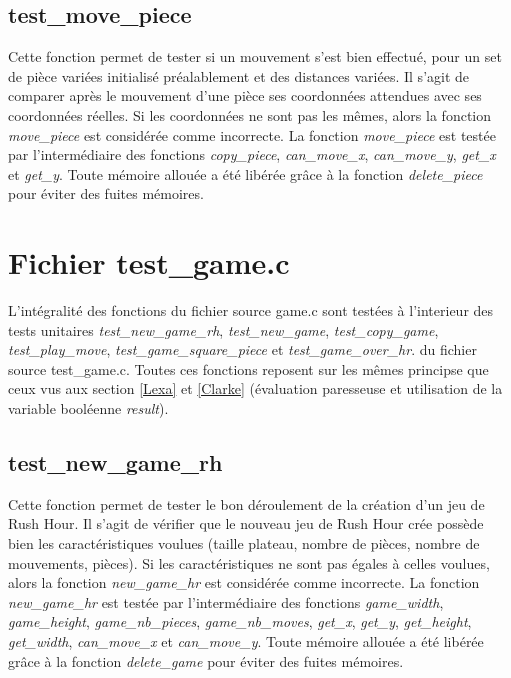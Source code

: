 \documentclass{report}
\begin{document}
\subsection{test\_move\_piece}
Cette fonction permet de tester si un mouvement s'est bien effectué, pour un set de pièce variées initialisé préalablement et des distances variées. Il s'agit de comparer après le mouvement d'une pièce ses coordonnées attendues avec ses coordonnées réelles. Si les coordonnées ne sont pas les mêmes, alors la fonction \emph{move\_piece} est considérée comme incorrecte. La fonction \emph{move\_piece} est testée par l'intermédiaire des fonctions \emph{copy\_piece}, \emph{can\_move\_x}, \emph{can\_move\_y}, \emph{get\_x} et \emph{get\_y}. Toute mémoire allouée a été libérée grâce à la fonction \emph{delete\_piece} pour éviter des fuites mémoires.

\section{Fichier test\_game.c}
L'intégralité des fonctions du fichier source game.c sont testées à l'interieur des tests unitaires \emph{test\_new\_game\_rh}, \emph{test\_new\_game}, \emph{test\_copy\_game}, \emph{test\_play\_move}, \emph{test\_game\_square\_piece} et \emph{test\_game\_over\_hr}. du fichier source test\_game.c. Toutes ces fonctions reposent sur les mêmes principse que ceux vus aux section \ref{Lexa} et \ref{Clarke} (évaluation paresseuse et utilisation de la variable booléenne \emph{result}).
\subsection{test\_new\_game\_rh}
Cette fonction permet de tester le bon déroulement de la création d'un jeu de Rush Hour. Il s'agit de vérifier que le nouveau jeu de Rush Hour crée possède bien les caractéristiques voulues (taille plateau, nombre de pièces, nombre de mouvements, pièces). Si les caractéristiques ne sont pas égales à celles voulues, alors la fonction \emph{new\_game\_hr} est considérée comme incorrecte. La fonction \emph{new\_game\_hr} est testée par l'intermédiaire des fonctions \emph{game\_width}, \emph{game\_height}, \emph{game\_nb\_pieces}, \emph{game\_nb\_moves}, \emph{get\_x}, \emph{get\_y}, \emph{get\_height}, \emph{get\_width}, \emph{can\_move\_x} et \emph{can\_move\_y}. Toute mémoire allouée a été libérée grâce à la fonction \emph{delete\_game} pour éviter des fuites mémoires.
\end{document}
